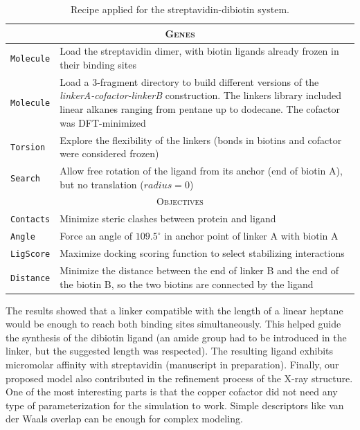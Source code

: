 \begin{table}[hbtp]
	\caption[Recipe applied for the streptavidin-dibiotin system]{Recipe applied for the streptavidin-dibiotin system.}
	\label{table:strep-recipe}
	\footnotesize
	\newcommand{\tableheading}[1]{\multicolumn{2}{c}{\textsc{#1}}}
	\begin{tabularx}{\textwidth}{RL}
		\toprule
		\tableheading{Genes}\\
		\toprule
		\texttt{Molecule} & Load the streptavidin dimer, with biotin ligands already frozen in their binding sites  \\
		\midrule
		\texttt{Molecule} & Load a 3-fragment directory to build different versions of the \textit{linkerA-cofactor-linkerB} construction. The linkers library included linear alkanes ranging from pentane up to dodecane. The cofactor was DFT-minimized \\
		\midrule
		\texttt{Torsion} & Explore the flexibility of the linkers (bonds in biotins and cofactor were considered frozen) \\
		\midrule
		\texttt{Search} & Allow free rotation of the ligand from its anchor (end of biotin A), but no translation ($radius=0$) \\
		\toprule
		\tableheading{Objectives}\\
		\toprule
		\texttt{Contacts} & Minimize steric clashes between protein and ligand \\
		\midrule
		\texttt{Angle} & Force an angle of $109.5^\circ$ in anchor point of linker A with biotin A \\
		\midrule
		\texttt{LigScore} & Maximize docking scoring function to select stabilizing interactions \\
		\midrule
		\texttt{Distance} & Minimize the distance between the end of linker B and the end of the biotin B, so the two biotins are connected by the ligand \\
		\bottomrule
	\end{tabularx}
\end{table}

The results showed that a linker compatible with the length of a linear heptane would be enough to reach both binding sites simultaneously. This helped guide the synthesis of the dibiotin ligand (an amide group had to be introduced in the linker, but the suggested length was respected). The resulting ligand exhibits micromolar affinity with streptavidin (manuscript in preparation). Finally, our proposed model also contributed in the refinement process of the X-ray structure. One of the most interesting parts is that the copper cofactor did not need any type of parameterization for the simulation to work. Simple descriptors like van der Waals overlap can be enough for complex modeling.

